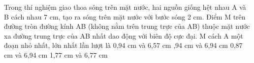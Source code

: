 \begin{vidu}%
Trong thí nghiệm giao thoa sóng trên mặt nước, hai nguồn giống hệt nhau A và B cách nhau 7 cm, tạo ra sóng trên mặt nước với bước sóng 2 cm. Điểm M trên đường tròn đường kính AB (không nằm trên trung trực của AB) thuộc mặt nước xa đường trung trực của AB nhất dao động với biên độ cực đại. M cách A một đoạn nhỏ nhất, lớn nhất lần lượt là
\choice
{0,94 cm và 6,57 cm}
{,94 cm và 6,94 cm}
{0,87 cm và 6,94 cm}
{1,77 cm và 6,77 cm}
\end{vidu} 
